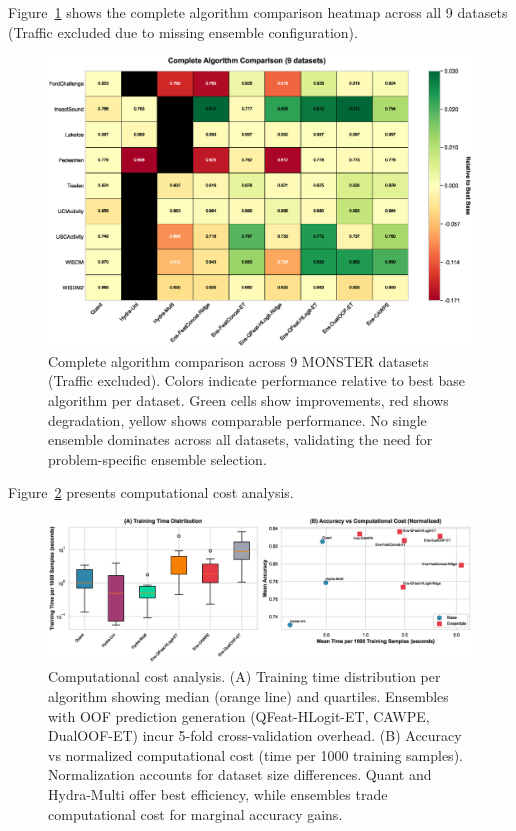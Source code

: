 \documentclass[pdflatex,sn-basic]{sn-jnl}           %
\theoremstyle{thmstyleone}%
\theoremstyle{thmstyletwo}%
\theoremstyle{thmstylethree}%
\begin{document}
\begin{appendices}
Figure~\ref{fig:full_heatmap} shows the complete algorithm comparison heatmap across all 9 datasets (Traffic excluded due to missing ensemble configuration).

\begin{figure}[!h]
\centering
\includegraphics[width=\textwidth]{figureA1_full_heatmap}
\caption{Complete algorithm comparison across 9 MONSTER datasets (Traffic excluded). Colors indicate performance relative to best base algorithm per dataset. Green cells show improvements, red shows degradation, yellow shows comparable performance. No single ensemble dominates across all datasets, validating the need for problem-specific ensemble selection.}\label{fig:full_heatmap}
\end{figure}

Figure~\ref{fig:computational} presents computational cost analysis.

\begin{figure}[!h]
\centering
\includegraphics[width=\textwidth]{figureA2_computational_cost}
\caption{Computational cost analysis. (A) Training time distribution per algorithm showing median (orange line) and quartiles. Ensembles with OOF prediction generation (QFeat-HLogit-ET, CAWPE, DualOOF-ET) incur 5-fold cross-validation overhead. (B) Accuracy vs normalized computational cost (time per 1000 training samples). Normalization accounts for dataset size differences. Quant and Hydra-Multi offer best efficiency, while ensembles trade computational cost for marginal accuracy gains.}\label{fig:computational}
\end{figure}

\end{appendices}
\end{document}

